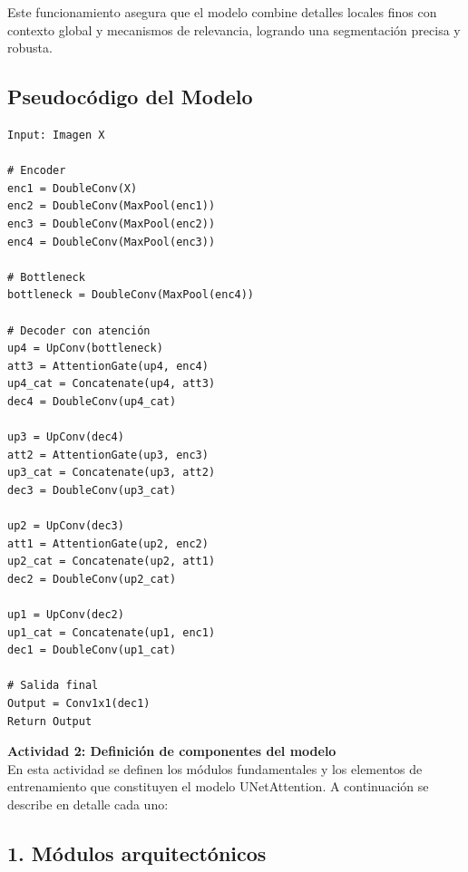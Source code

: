 Este funcionamiento asegura que el modelo combine detalles locales finos con contexto global y mecanismos de relevancia, logrando una segmentación precisa y robusta.

\subsection*{Pseudocódigo del Modelo}
\begin{verbatim}
Input: Imagen X

# Encoder
enc1 = DoubleConv(X)
enc2 = DoubleConv(MaxPool(enc1))
enc3 = DoubleConv(MaxPool(enc2))
enc4 = DoubleConv(MaxPool(enc3))

# Bottleneck
bottleneck = DoubleConv(MaxPool(enc4))

# Decoder con atención
up4 = UpConv(bottleneck)
att3 = AttentionGate(up4, enc4)
up4_cat = Concatenate(up4, att3)
dec4 = DoubleConv(up4_cat)

up3 = UpConv(dec4)
att2 = AttentionGate(up3, enc3)
up3_cat = Concatenate(up3, att2)
dec3 = DoubleConv(up3_cat)

up2 = UpConv(dec3)
att1 = AttentionGate(up2, enc2)
up2_cat = Concatenate(up2, att1)
dec2 = DoubleConv(up2_cat)

up1 = UpConv(dec2)
up1_cat = Concatenate(up1, enc1)
dec1 = DoubleConv(up1_cat)

# Salida final
Output = Conv1x1(dec1)
Return Output
\end{verbatim}

\textbf{Actividad 2: Definición de componentes del modelo}\\
En esta actividad se definen los módulos fundamentales y los elementos de entrenamiento que constituyen el modelo UNetAttention. A continuación se describe en detalle cada uno:

\subsection*{1. Módulos arquitectónicos}

